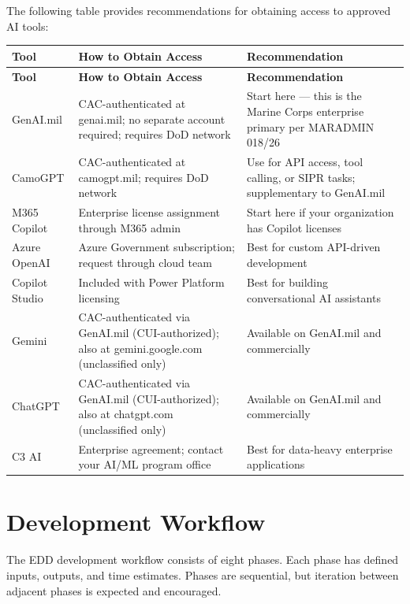 \documentclass[11pt,letterpaper]{article}
\begin{document}
The following table provides recommendations for obtaining access to approved AI tools:

\begin{longtable}{@{}p{2.5cm}p{5.5cm}p{5.5cm}@{}}
\toprule
\textbf{Tool} & \textbf{How to Obtain Access} & \textbf{Recommendation} \\
\midrule
\endfirsthead
\toprule
\textbf{Tool} & \textbf{How to Obtain Access} & \textbf{Recommendation} \\
\midrule
\endhead
\bottomrule
\endlastfoot
GenAI.mil & CAC-authenticated at genai.mil; no separate account required; requires DoD network & Start here --- this is the Marine Corps enterprise primary per MARADMIN 018/26 \\
\midrule
CamoGPT & CAC-authenticated at camogpt.mil; requires DoD network & Use for API access, tool calling, or SIPR tasks; supplementary to GenAI.mil \\
\midrule
M365 Copilot & Enterprise license assignment through M365 admin & Start here if your organization has Copilot licenses \\
\midrule
Azure OpenAI & Azure Government subscription; request through cloud team & Best for custom API-driven development \\
\midrule
Copilot Studio & Included with Power Platform licensing & Best for building conversational AI assistants \\
\midrule
Gemini & CAC-authenticated via GenAI.mil (CUI-authorized); also at gemini.google.com (unclassified only) & Available on GenAI.mil and commercially \\
\midrule
ChatGPT & CAC-authenticated via GenAI.mil (CUI-authorized); also at chatgpt.com (unclassified only) & Available on GenAI.mil and commercially \\
\midrule
C3 AI & Enterprise agreement; contact your AI/ML program office & Best for data-heavy enterprise applications \\
\end{longtable}

\section{Development Workflow}
\label{sec:development-workflow}

The EDD development workflow consists of eight phases. Each phase has defined inputs,
outputs, and time estimates. Phases are sequential, but iteration between adjacent
phases is expected and encouraged.
\end{document}
